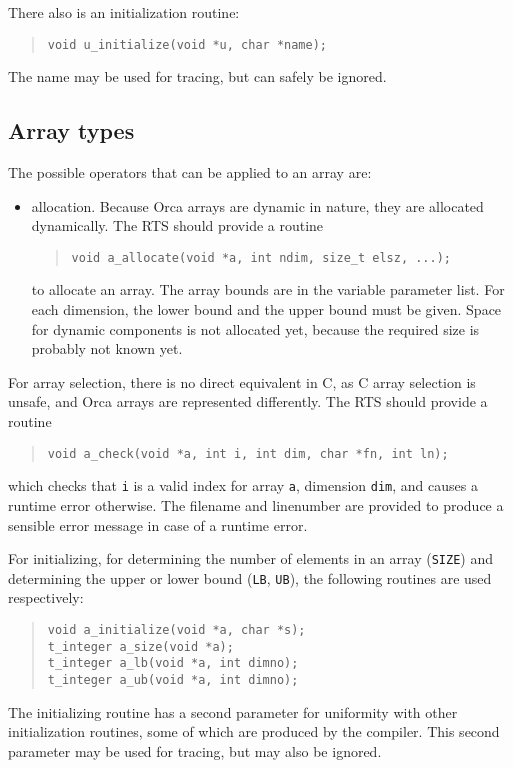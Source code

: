 \documentclass[10pt]{article}
\begin{document}
There also is an initialization routine:
\begin{quote}
\begin{verbatim}
void u_initialize(void *u, char *name);
\end{verbatim}
\end{quote}
The name may be used for tracing, but can safely be ignored.

\subsection{Array types}
The possible operators that can be applied to an array are:
\begin{itemize}
\item
allocation.
Because Orca arrays are dynamic in nature, they are allocated dynamically.
The RTS should provide a routine
\begin{quote}
\begin{verbatim}
void a_allocate(void *a, int ndim, size_t elsz, ...);
\end{verbatim}
\end{quote}
to allocate an array.
The array bounds are in the variable parameter list. For each dimension,
the lower bound and the upper bound must be given.
Space for dynamic components is not allocated yet, because the
required size is probably not known yet.
\end{itemize}
For array selection, there is no direct equivalent in C, as C array selection
is unsafe, and Orca arrays are represented differently.
The RTS should provide a routine
\begin{quote}
\begin{verbatim}
void a_check(void *a, int i, int dim, char *fn, int ln);
\end{verbatim}
\end{quote}
which checks that \verb+i+ is a valid
index for array \verb+a+, dimension \verb+dim+,
and causes a runtime error otherwise.
The filename and linenumber are provided to produce a sensible error message
in case of a runtime error.

For initializing,
for determining the number of elements in an array (\verb+SIZE+)
and determining the upper or lower bound (\verb+LB+, \verb+UB+),
the following routines are used respectively:
\begin{quote}
\begin{verbatim}
void a_initialize(void *a, char *s);
t_integer a_size(void *a);
t_integer a_lb(void *a, int dimno);
t_integer a_ub(void *a, int dimno);
\end{verbatim}
\end{quote}
The initializing routine has a second parameter for uniformity with other
initialization routines, some of which are produced by the compiler.
This second parameter may be used for tracing, but may also be ignored.
\end{document}
